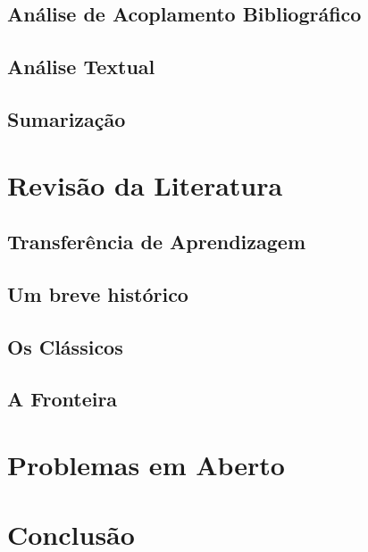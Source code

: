 \documentclass[sigconf]{acmart}
\begin{document}
  \subsection{Análise de Acoplamento Bibliográfico}
  \subsection{Análise Textual}
  \subsection{Sumarização}
\section{Revisão da Literatura}
  \subsection{Transferência de Aprendizagem}
  \subsection{Um breve histórico}
  \subsection{Os Clássicos}
  \subsection{A Fronteira}
\section{Problemas em Aberto}
\section{Conclusão}


\end{document}
